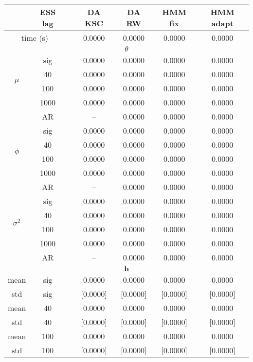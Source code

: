 { \renewcommand{\arraystretch}{1.2} 
\begin{table} 
\center 
\begin{tabular}{ccc cc cc} 
\hline 
 & ESS lag&& DA KSC & DA RW & HMM fix & HMM adapt \\ \hline  \hline
 \multicolumn{2}{c}{time (s)}& & 0.0000  & 0.0000  & 0.0000  & 0.0000  \\  \hline 
\multicolumn{7}{c}{$\theta$} \\ \hline 
\multirow{4}{*}{$\mu$}   & sig &  & 0.0000  & 0.0000  & 0.0000  & 0.0000  \\ 
 & 40 &  & 0.0000  & 0.0000  & 0.0000  & 0.0000  \\ 
 & 100 &  & 0.0000  & 0.0000  & 0.0000  & 0.0000  \\ 
 & 1000 &  & 0.0000  & 0.0000  & 0.0000  & 0.0000  \\ 
 & AR & & --  & 0.0000  & 0.0000  & 0.0000  \\ [1.3ex] 
\multirow{4}{*}{$\phi$}   & sig &  & 0.0000  & 0.0000  & 0.0000  & 0.0000  \\ 
 & 40 &  & 0.0000  & 0.0000  & 0.0000  & 0.0000  \\ 
 & 100 &  & 0.0000  & 0.0000  & 0.0000  & 0.0000  \\ 
 & 1000 &  & 0.0000  & 0.0000  & 0.0000  & 0.0000  \\ 
 & AR & & --  & 0.0000  & 0.0000  & 0.0000  \\ [1.3ex] 
\multirow{4}{*}{$\sigma^2$}   & sig &  & 0.0000  & 0.0000  & 0.0000  & 0.0000  \\ 
 & 40 &  & 0.0000  & 0.0000  & 0.0000  & 0.0000  \\ 
 & 100 &  & 0.0000  & 0.0000  & 0.0000  & 0.0000  \\ 
 & 1000 &  & 0.0000  & 0.0000  & 0.0000  & 0.0000  \\ 
 & AR & & --  & 0.0000  & 0.0000  & 0.0000  \\ [1.3ex] 
\hline 
\multicolumn{7}{c}{$ \bm{h} $} \\ \hline 
mean & sig &  & 0.0000  & 0.0000  & 0.0000  & 0.0000  \\ 
std & sig &  & [0.0000]  & [0.0000]  & [0.0000]  & [0.0000]  \\  [1ex]
mean & 40 &  & 0.0000  & 0.0000  & 0.0000  & 0.0000  \\ 
std & 40 &  & [0.0000]  & [0.0000]  & [0.0000]  & [0.0000]  \\  [1ex]
mean & 100 &  & 0.0000  & 0.0000  & 0.0000  & 0.0000  \\ 
std & 100 &  & [0.0000]  & [0.0000]  & [0.0000]  & [0.0000]  \\  [1ex]

\end{tabular}
\end{table}}
